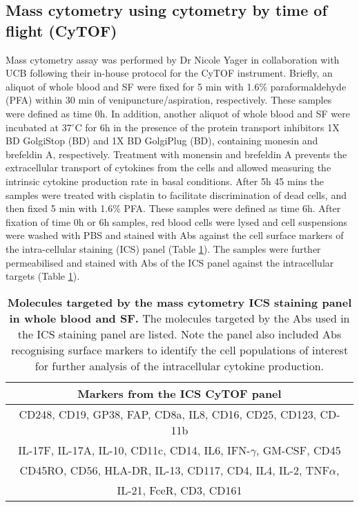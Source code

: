 \subsection{Mass cytometry using cytometry by time of flight (CyTOF)}
Mass cytometry assay was performed by Dr Nicole Yager in collaboration with UCB following their in-house protocol for the CyTOF instrument. Briefly, an aliquot of whole blood and SF were fixed for 5 min with 1.6\% paraformaldehyde (PFA) within 30 min of venipuncture/aspiration, respectively. These samples were defined as time 0h. In addition, another aliquot of whole blood and SF were incubated at 37{$^\circ$}C for 6h in the presence of the protein transport inhibitors 1X BD GolgiStop (BD) and 1X BD GolgiPlug (BD), containing monesin and brefeldin A, respectively. Treatment with monensin and brefeldin A prevents the extracellular transport of cytokines from the cells and allowed measuring the intrinsic cytokine production rate in basal conditions. After 5h 45 mins the samples were treated with cisplatin to facilitate discrimination of dead cells, and then fixed 5 min with 1.6\% PFA. These samples were defined as time 6h. After fixation of time 0h or 6h samples, red blood cells were lysed and cell suspensions were washed with PBS and stained with Abs against the cell surface markers of the intra-cellular staining (ICS) panel (Table \ref{tab:CyTOF}). The samples were further permeabilised and stained with Abs of the ICS panel against the intracellular targets (Table \ref{tab:CyTOF}). 



\begin{table}[htbp]
\setlength{\tabcolsep}{20pt}
\renewcommand{\arraystretch}{1.5}
\begin{tabular}{@{} c}
\toprule
\textbf{Markers from the ICS CyTOF panel} \\
\midrule
\midrule
CD248, CD19, GP38, FAP, CD8a, IL8, CD16, CD25, CD123, CD-11b \\
IL-17F, IL-17A, IL-10, CD11c, CD14, IL6, IFN-$\gamma$, GM-CSF, CD45\\
CD45RO, CD56, HLA-DR, IL-13, CD117, CD4, IL4, IL-2, TNF$\alpha$,\\
IL-21, FceR, CD3, CD161\\
\bottomrule
\end{tabular}
\medskip %
\caption[Molecules targeted by the mass cytometry ICS staining panel in whole blood and SF.]{\textbf{Molecules targeted by the mass cytometry ICS staining panel in whole blood and SF.} The molecules targeted by the Abs used in the ICS staining panel are listed. Note the panel also included Abs recognising surface markers to identify the cell populations of interest for further analysis of the intracellular cytokine production.}
\label{tab:CyTOF}
\end{table}
\bigskip %




